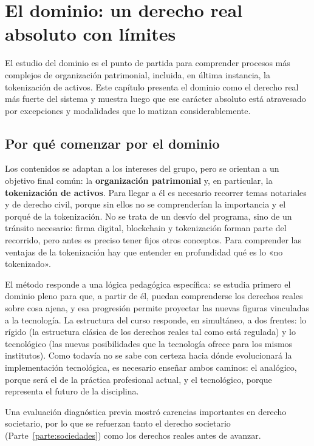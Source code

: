 \documentclass[12pt,oneside]{book}
\begin{document}
\chapter{El dominio: un derecho real absoluto con límites}
\label{cap:dominio}

El estudio del dominio es el punto de partida para comprender procesos más complejos de organización patrimonial, incluida, en última instancia, la tokenización de activos. Este capítulo presenta el dominio como el derecho real más fuerte del sistema y muestra luego que ese carácter absoluto está atravesado por excepciones y modalidades que lo matizan considerablemente.

\section{Por qué comenzar por el dominio}
\label{sec:introduccion}

Los contenidos se adaptan a los intereses del grupo, pero se orientan a un objetivo final común: la \textbf{organización patrimonial} y, en particular, la \textbf{tokenización de activos}. Para llegar a él es necesario recorrer temas notariales y de derecho civil, porque sin ellos no se comprenderían la importancia y el porqué de la tokenización. No se trata de un desvío del programa, sino de un tránsito necesario: firma digital, blockchain y tokenización forman parte del recorrido, pero antes es preciso tener fijos otros conceptos. Para comprender las ventajas de la tokenización hay que entender en profundidad qué es lo «no tokenizado».

El método responde a una lógica pedagógica específica: se estudia primero el dominio pleno para que, a partir de él, puedan comprenderse los derechos reales sobre cosa ajena, y esa progresión permite proyectar las nuevas figuras vinculadas a la tecnología. La estructura del curso responde, en simultáneo, a dos frentes: lo rígido (la estructura clásica de los derechos reales tal como está regulada) y lo tecnológico (las nuevas posibilidades que la tecnología ofrece para los mismos institutos). Como todavía no se sabe con certeza hacia dónde evolucionará la implementación tecnológica, es necesario enseñar ambos caminos: el analógico, porque será el de la práctica profesional actual, y el tecnológico, porque representa el futuro de la disciplina.

Una evaluación diagnóstica previa mostró carencias importantes en derecho societario, por lo que se refuerzan tanto el derecho societario (Parte~\ref{parte:sociedades}) como los derechos reales antes de avanzar.
\end{document}
